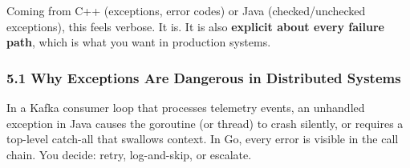 \documentclass[11pt,openany]{book}
\begin{document}
Coming from C++ (exceptions, error codes) or Java (checked/unchecked
exceptions), this feels verbose. It is. It is also \textbf{explicit
about every failure path}, which is what you want in production systems.

\hypertarget{why-exceptions-are-dangerous-in-distributed-systems}{%
\subsubsection{5.1 Why Exceptions Are Dangerous in Distributed
Systems}\label{why-exceptions-are-dangerous-in-distributed-systems}}

In a Kafka consumer loop that processes telemetry events, an unhandled
exception in Java causes the goroutine (or thread) to crash silently, or
requires a top-level catch-all that swallows context. In Go, every error
is visible in the call chain. You decide: retry, log-and-skip, or
escalate.
\end{document}
